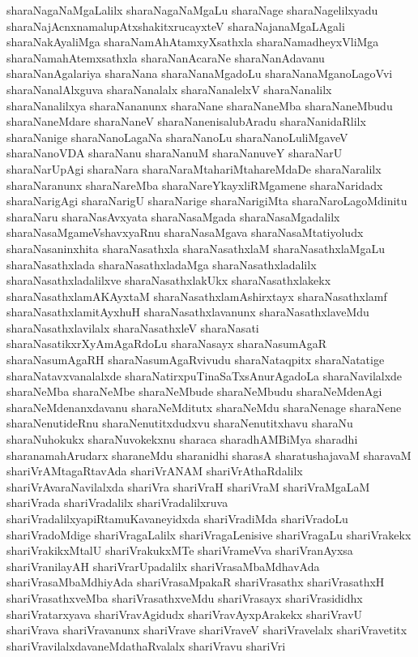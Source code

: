 {sharaNagaNaMgaLalilx
sharaNagaNaMgaLu
sharaNage
sharaNagelilxyadu
sharaNajAcnxnamalupAtxshakitxrucayxteV
sharaNajanaMgaLAgali
sharaNakAyaliMga
sharaNamAhAtamxyXsathxla
sharaNamadheyxVliMga
sharaNamahAtemxsathxla
sharaNanAcaraNe
sharaNanAdavanu
sharaNanAgalariya
sharaNana
sharaNanaMgadoLu
sharaNanaMganoLagoVvi
sharaNanalAlxguva
sharaNanalalx
sharaNanalelxV
sharaNanalilx
sharaNanalilxya
sharaNananunx
sharaNane
sharaNaneMba
sharaNaneMbudu
sharaNaneMdare
sharaNaneV
sharaNanenisalubAradu
sharaNanidaRlilx
sharaNanige
sharaNanoLagaNa
sharaNanoLu
sharaNanoLuliMgaveV
sharaNanoVDA
sharaNanu
sharaNanuM
sharaNanuveY
sharaNarU
sharaNarUpAgi
sharaNara
sharaNaraMtahariMtahareMdaDe
sharaNaralilx
sharaNaranunx
sharaNareMba
sharaNareYkayxliRMgamene
sharaNaridadx
sharaNarigAgi
sharaNarigU
sharaNarige
sharaNarigiMta
sharaNaroLagoMdinitu
sharaNaru
sharaNasAvxyata
sharaNasaMgada
sharaNasaMgadalilx
sharaNasaMgameVshavxyaRnu
sharaNasaMgava
sharaNasaMtatiyoludx
sharaNasaninxhita
sharaNasathxla
sharaNasathxlaM
sharaNasathxlaMgaLu
sharaNasathxlada
sharaNasathxladaMga
sharaNasathxladalilx
sharaNasathxladalilxve
sharaNasathxlakUkx
sharaNasathxlakekx
sharaNasathxlamAKAyxtaM
sharaNasathxlamAshirxtayx
sharaNasathxlamf
sharaNasathxlamitAyxhuH
sharaNasathxlavanunx
sharaNasathxlaveMdu
sharaNasathxlavilalx
sharaNasathxleV
sharaNasati
sharaNasatikxrXyAmAgaRdoLu
sharaNasayx
sharaNasumAgaR
sharaNasumAgaRH
sharaNasumAgaRvivudu
sharaNataqpitx
sharaNatatige
sharaNatavxvanalalxde
sharaNatirxpuTinaSaTxsAnurAgadoLa
sharaNavilalxde
sharaNeMba
sharaNeMbe
sharaNeMbude
sharaNeMbudu
sharaNeMdenAgi
sharaNeMdenanxdavanu
sharaNeMditutx
sharaNeMdu
sharaNenage
sharaNene
sharaNenutideRnu
sharaNenutitxdudxvu
sharaNenutitxhavu
sharaNu
sharaNuhokukx
sharaNuvokekxnu
sharaca
sharadhAMBiMya
sharadhi
sharanamahArudarx
sharaneMdu
sharanidhi
sharasA
sharatushajavaM
sharavaM
shariVrAMtagaRtavAda
shariVrANAM
shariVrAthaRdalilx
shariVrAvaraNavilalxda
shariVra
shariVraH
shariVraM
shariVraMgaLaM
shariVrada
shariVradalilx
shariVradalilxruva
shariVradalilxyapiRtamuKavaneyidxda
shariVradiMda
shariVradoLu
shariVradoMdige
shariVragaLalilx
shariVragaLenisive
shariVragaLu
shariVrakekx
shariVrakikxMtalU
shariVrakukxMTe
shariVrameVva
shariVranAyxsa
shariVranilayAH
shariVrarUpadalilx
shariVrasaMbaMdhavAda
shariVrasaMbaMdhiyAda
shariVrasaMpakaR
shariVrasathx
shariVrasathxH
shariVrasathxveMba
shariVrasathxveMdu
shariVrasayx
shariVrasididhx
shariVratarxyava
shariVravAgidudx
shariVravAyxpArakekx
shariVravU
shariVrava
shariVravanunx
shariVrave
shariVraveV
shariVravelalx
shariVravetitx
shariVravilalxdavaneMdathaRvalalx
shariVravu
shariVri
}
